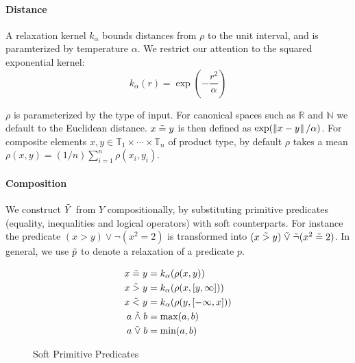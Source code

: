 \paragraph{Distance} A relaxation kernel $k_\alpha$ bounds distances from $\rho$ to the unit interval, and is paramterized by temperature $\alpha$.
We restrict our attention to the squared exponential kernel:
\begin{equation}
k_{\alpha}(r) = \exp\left(-\frac{r^2}{\alpha}\right)
\end{equation}

$\rho$ is parameterized by the type of input.
For canonical spaces such as $\mathbb{R}$ and $\mathbb{N}$ we default to the Euclidean distance. 
$x \mathrel{\tilde{=}} y$ is then defined as $\exp(\left\|{{x - y}}\right\|/\alpha)$.
For composite elements $x, y \in \mathbb{T}_1 \times \cdots \times \mathbb{T}_n$ of product type, by default $\rho$ takes a mean $\rho(x, y) = (1/n)\sum^n_{i=1}\rho(x_i, y_i)$.






\paragraph{Composition} We construct $\tilde{Y}$ from $Y$ compositionally, by substituting primitive predicates (equality, inequalities and logical operators) with soft counterparts.
For instance the predicate $(x > y) \lor \neg(x^2 = 2)$ is transformed into $(x \mathrel{\tilde{>}} y) \mathrel{\tilde{\lor}} \tilde{\neg}(x^2 \mathrel{\tilde{=}} 2)$.
In general, we use $\mathrel{\tilde{p}}$ to denote a relaxation of a predicate $p$.
\begin{figure}[H]\label{softpreds}
  \begin{align*}
x \mathrel{\tilde{=}} y &= k_\alpha(\rho(x, y))\\
x \mathrel{\tilde{>}} y &= k_\alpha(\rho(x, [y, \infty]))\\
x \mathrel{\tilde{<}} y &= k_\alpha(\rho(y, [-\infty, x]))\\
a \mathrel{\tilde{\land}} b &= \max(a, b)\\
a \mathrel{\tilde{\lor}} b &= \min(a, b)
\end{align*}
\caption{Soft Primitive Predicates}
\end{figure}

